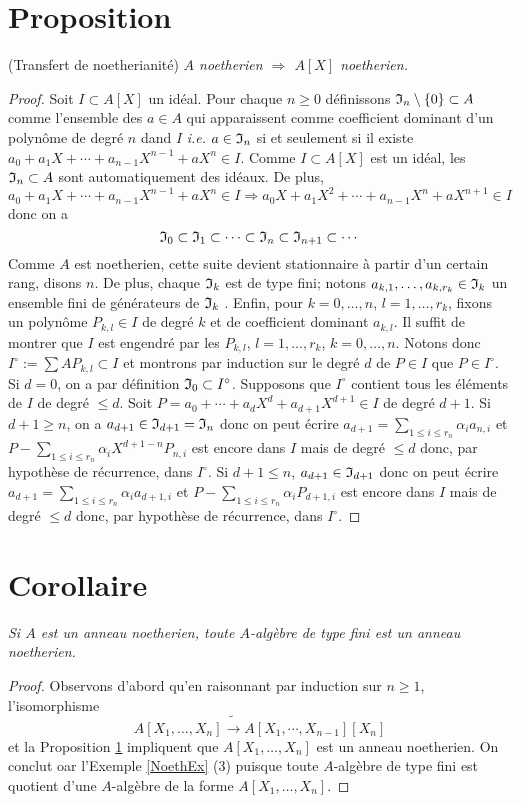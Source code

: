 \documentclass[a4paper, oneside, 12pt]{book}
\theoremstyle{definition} %
\newcommand{\ie}{\textit{i.e.}} %
\begin{document}
\section{Proposition}\label{NoethTransfert} (Transfert de noetherianité) \textit{$A$ noetherien $\Rightarrow$ $A[X]$ noetherien.}
\begin{proof}Soit $I\subset A[X]$ un idéal. Pour chaque $n\geq 0$ définissons $\frak{I}_n\setminus \lbrace 0\rbrace\subset A$ comme l'ensemble des $a\in A$ qui apparaissent comme coefficient dominant  d'un polynôme de degré $n$ dand $I$ \ie{} $a\in \frak{I}_n$ si et seulement si il existe $a_0+a_1X+\cdots+a_{n-1}X^{n-1}+aX^n\in I$. Comme $I\subset A[X]$ est un idéal, les $\frak{I}_n\subset A$ sont automatiquement des idéaux. De plus,  $$a_0+a_1X+\cdots+a_{n-1}X^{n-1}+aX^n\in I\Rightarrow a_0X+a_1X^2+\cdots+a_{n-1}X^{n}+aX^{n+1}\in I$$ donc on a 
$$\frak{I}_0\subset \frak{I}_1\subset \cdots\subset \frak{I}_n\subset \frak{I}_{n+1}\subset \cdots$$
Comme $A$ est noetherien, cette suite devient stationnaire à partir d'un certain rang, disons $n$. De plus,  chaque $\frak{I}_k$ est de type fini; notons $a_{k,1},\dots, a_{k,r_k}\in \frak{I}_k$ un ensemble fini de générateurs de $\frak{I}_k$ . Enfin,  pour  $k=0,\dots, n$, $l=1,\dots, r_k$, fixons un polynôme $P_{k,l}\in I$ de degré $k$ et de coefficient dominant $a_{k,l}$. Il suffit de montrer que $I$ est engendré par les $P_{k,l}$,  $l=1,\dots, r_k$, $k=0,\dots, n$. Notons donc $I^\circ:=\sum AP_{k,l}\subset I$ et montrons par induction sur le degré $d$ de $P\in I$ que $P\in I^\circ$. Si $d=0$, on a par définition $  \frak{I}_0\subset I^\circ$. Supposons que $I^\circ$ contient tous les   éléments de $I$ de degré $\leq d$. Soit $P=a_0+\cdots+a_dX^d+a_{d+1}X^{d+1}\in I$ de degré $d+1$. Si $d+1\geq n$, on a $a_{d+1}\in \frak{I}_{d+1}=\frak{I}_n$ donc on peut écrire $a_{d+1}=\sum_{1\leq i\leq r_n}\alpha_ia_{n,i}$ et $P-\sum_{1\leq i\leq r_n}\alpha_iX^{d+1-n}P_{n,i}$ est encore dans $I$ mais de degré $\leq d$ donc, par hypothèse de récurrence, dans $I^\circ$. Si $d+1\leq n$, $a_{d+1}\in \frak{I}_{d+1}$ donc on peut écrire $a_{d+1}=\sum_{1\leq i\leq r_n}\alpha_ia_{d+1,i}$ et $P-\sum_{1\leq i\leq r_n}\alpha_i P_{d+1,i}$ est encore dans $I$ mais de degré $\leq d$ donc, par hypothèse de récurrence, dans $I^\circ$. 
\end{proof}


\section{Corollaire}\label{NoethTransfertCor} \textit{Si $A$ est un anneau noetherien, toute $A$-algèbre de type fini est un anneau noetherien.}
\begin{proof} Observons d'abord qu'en raisonnant par induction sur $n\geq 1$,   l'isomorphisme $$A[X_1,\dots, X_n]\tilde{\rightarrow} A[X_1,\cdots,X_{n-1}] [X_n]$$ et la Proposition \ref{NoethTransfert} impliquent que $A[X_1,\dots, X_n]$ est un anneau noetherien. On conclut oar l'Exemple \ref{NoethEx} (3) puisque toute $A$-algèbre de type fini  est quotient d'une $A$-algèbre de la forme $A[X_1,\dots, X_n]$. \end{proof}
\end{document}

